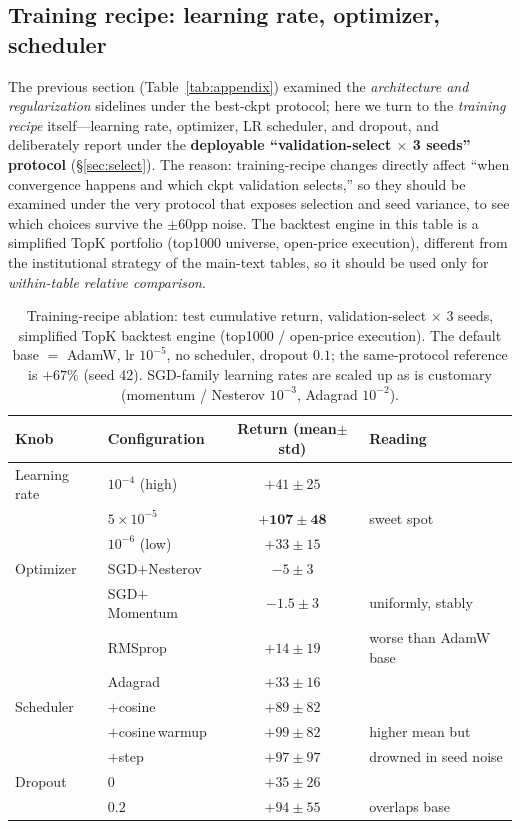 \documentclass[a4paper,11pt]{article}
\begin{document}
\subsection{Training recipe: learning rate, optimizer, scheduler}\label{sec:abl-recipe}
The previous section (Table~\ref{tab:appendix}) examined the \emph{architecture
and regularization} sidelines under the best-ckpt protocol; here we turn to the
\emph{training recipe} itself---learning rate, optimizer, LR scheduler, and
dropout, and deliberately report under the
\textbf{deployable ``validation-select $\times$ 3 seeds'' protocol}
(\S\ref{sec:select}). The reason: training-recipe changes directly affect
``when convergence happens and which ckpt validation selects,'' so they should
be examined under the very protocol that exposes selection and seed variance,
to see which choices survive the $\pm60$pp noise. The backtest engine in this
table is a simplified TopK portfolio (top1000 universe, open-price execution),
different from the institutional strategy of the main-text tables, so it should
be used only for \emph{within-table relative comparison}.

\begin{table}[H]
\centering
\caption{Training-recipe ablation: test cumulative return, validation-select
$\times$ 3 seeds, simplified TopK backtest engine (top1000 / open-price
execution). The default base $=$ AdamW, lr $10^{-5}$, no scheduler, dropout
$0.1$; the same-protocol reference is $+67\%$ (seed 42). SGD-family learning
rates are scaled up as is customary (momentum / Nesterov $10^{-3}$, Adagrad
$10^{-2}$).}
\label{tab:recipe}
\begin{tabular}{llcl}
\toprule
Knob & Configuration & Return (mean$\pm$std) & Reading \\
\midrule
Learning rate   & $10^{-4}$ (high)       & $+41\pm25$           & \\
         & $5\times10^{-5}$       & $\mathbf{+107\pm48}$ & sweet spot \\
         & $10^{-6}$ (low)       & $+33\pm15$           & \\
\midrule
Optimizer   & SGD$+$Nesterov         & $-5\pm3$    & \\
         & SGD$+$Momentum         & $-1.5\pm3$  & uniformly, stably \\
         & RMSprop                & $+14\pm19$  & worse than AdamW base \\
         & Adagrad                & $+33\pm16$  & \\
\midrule
Scheduler   & $+$cosine              & $+89\pm82$  & \\
         & $+$cosine\,warmup      & $+99\pm82$  & higher mean but \\
         & $+$step                & $+97\pm97$  & drowned in seed noise \\
\midrule
Dropout  & $0$                    & $+35\pm26$  & \\
         & $0.2$                  & $+94\pm55$  & overlaps base \\
\bottomrule
\end{tabular}
\end{table}
\end{document}
